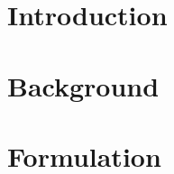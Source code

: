 

\section{Introduction}
\label{sec:introduction}


%

\section{Background}
\label{sec:background}


%

\section{Formulation}
\label{sec:formulation}


%


%



